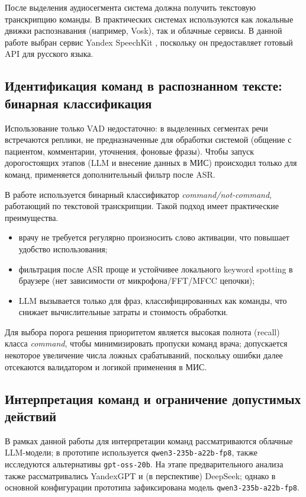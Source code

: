 После выделения аудиосегмента система должна получить текстовую транскрипцию команды.
В практических системах используются как локальные движки распознавания (например, Vosk), так и облачные сервисы.
В данной работе выбран сервис Yandex SpeechKit \cite{YandexSpeechKit}, поскольку он предоставляет готовый API для русского языка.

\subsection{Идентификация команд в распознанном тексте: бинарная классификация}
\label{subsec:text_classification_rw}

Использование только VAD недостаточно: в выделенных сегментах речи встречаются реплики, не предназначенные для обработки системой
(общение с пациентом, комментарии, уточнения, фоновые фразы). Чтобы запуск дорогостоящих этапов (LLM и внесение данных в МИС)
происходил только для команд, применяется дополнительный фильтр после ASR.

В работе используется бинарный классификатор \textit{command/not-command}, работающий по текстовой транскрипции.
Такой подход имеет практические преимущества.
\begin{itemize}
    \item врачу не требуется регулярно произносить слово активации, что повышает удобство использования;
    \item фильтрация после ASR проще и устойчивее локального keyword spotting в браузере (нет зависимости от микрофона/FFT/MFCC цепочки);
    \item LLM вызывается только для фраз, классифицированных как команды, что снижает вычислительные затраты и стоимость обработки.
\end{itemize}

Для выбора порога решения приоритетом является высокая полнота (recall) класса \textit{command}, чтобы минимизировать пропуски команд врача;
допускается некоторое увеличение числа ложных срабатываний, поскольку ошибки далее отсекаются валидатором и логикой применения в МИС.

\subsection{Интерпретация команд и ограничение допустимых действий}

В рамках данной работы для интерпретации команд рассматриваются облачные LLM-модели; в прототипе используется \texttt{qwen3-235b-a22b-fp8}, также исследуются альтернативы \texttt{gpt-oss-20b}. На этапе предварительного анализа также рассматривались YandexGPT и (в перспективе) DeepSeek; однако в основной конфигурации прототипа зафиксирована модель \texttt{qwen3-235b-a22b-fp8}.

